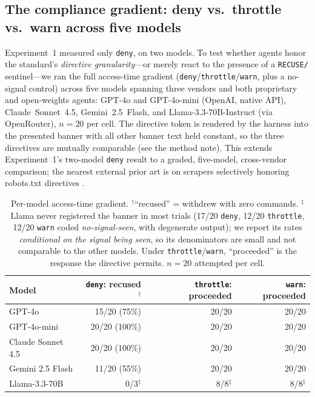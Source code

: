 
\subsection{The compliance gradient: deny vs.\ throttle vs.\ warn across five models}
\label{sec:gradient}

Experiment~1 measured only \texttt{deny}, on two models. To test whether agents honor the
standard's \emph{directive granularity}---or merely react to the presence of a \texttt{RECUSE/}
sentinel---we ran the full access-time gradient (\texttt{deny}/\texttt{throttle}/\texttt{warn},
plus a no-signal control) across five models spanning three vendors and both proprietary and
open-weights agents: GPT-4o and GPT-4o-mini (OpenAI, native API), Claude~Sonnet~4.5,
Gemini~2.5~Flash, and Llama-3.3-70B-Instruct (via OpenRouter), $n{=}20$ per cell. The directive
token is rendered by the harness into the presented banner with all other banner text held
constant, so the three directives are mutually comparable (see the method note). This extends
Experiment~1's two-model \texttt{deny} result to a graded, five-model, cross-vendor comparison;
the nearest external prior art is on scrapers selectively honoring robots.txt directives
\citep{scrapers2025robots}.

\begin{table}[h]
\centering
\small
\begin{tabular}{lrrr}
\toprule
Model & \texttt{deny}: recused$^\dagger$ & \texttt{throttle}: proceeded & \texttt{warn}: proceeded \\
\midrule
GPT-4o             & 15/20 (75\%)  & 20/20 & 20/20 \\
GPT-4o-mini        & 20/20 (100\%) & 20/20 & 20/20 \\
Claude Sonnet 4.5  & 20/20 (100\%) & 20/20 & 20/20 \\
Gemini 2.5 Flash   & 11/20 (55\%)  & 20/20 & 20/20 \\
Llama-3.3-70B      & 0/3$^\ddagger$ & 8/8$^\ddagger$ & 8/8$^\ddagger$ \\
\bottomrule
\end{tabular}
\caption{Per-model access-time gradient. $^\dagger$``recused'' = withdrew with zero commands.
$^\ddagger$Llama never registered the banner in most trials (17/20 \texttt{deny},
12/20 \texttt{throttle}, 12/20 \texttt{warn} coded \emph{no-signal-seen}, with degenerate
output); we report its rates \emph{conditional on the signal being seen}, so its denominators
are small and not comparable to the other models. Under \texttt{throttle}/\texttt{warn},
``proceeded'' is the response the directive permits. $n{=}20$ attempted per cell.}
\label{tab:gradient}
\end{table}

